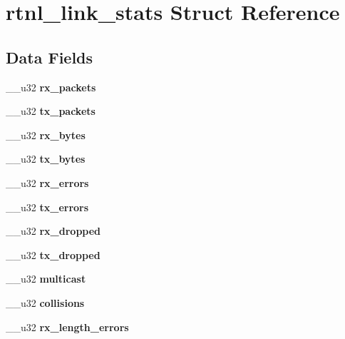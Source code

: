 \section{rtnl\-\_\-link\-\_\-stats \-Struct \-Reference}
\label{structrtnl__link__stats}
\subsection*{\-Data \-Fields}
\begin{DoxyCompactItemize}
\item 
\-\_\-\-\_\-u32 {\bfseries rx\-\_\-packets}\label{structrtnl__link__stats_aa3afa8a930bcd3352eb0101b363e3724}

\item 
\-\_\-\-\_\-u32 {\bfseries tx\-\_\-packets}\label{structrtnl__link__stats_a82861c7f00d557e73e629577f8e9a00d}

\item 
\-\_\-\-\_\-u32 {\bfseries rx\-\_\-bytes}\label{structrtnl__link__stats_a3627f5da128573208e2dad1c83ca9b5b}

\item 
\-\_\-\-\_\-u32 {\bfseries tx\-\_\-bytes}\label{structrtnl__link__stats_a989428ba6b047cdd85d98da112489ff9}

\item 
\-\_\-\-\_\-u32 {\bfseries rx\-\_\-errors}\label{structrtnl__link__stats_a31aaca1b6ee708ad896a4b07b1cd7a05}

\item 
\-\_\-\-\_\-u32 {\bfseries tx\-\_\-errors}\label{structrtnl__link__stats_a05d5f4e24194cf33aecd8a3f660b0043}

\item 
\-\_\-\-\_\-u32 {\bfseries rx\-\_\-dropped}\label{structrtnl__link__stats_a1b92e8392e11c8cb861d797a9ee7ca91}

\item 
\-\_\-\-\_\-u32 {\bfseries tx\-\_\-dropped}\label{structrtnl__link__stats_ab4bcde49fa5648188e9a78a558ba5f47}

\item 
\-\_\-\-\_\-u32 {\bfseries multicast}\label{structrtnl__link__stats_ac4a0e780f7c1368a3fd25b640b19ac23}

\item 
\-\_\-\-\_\-u32 {\bfseries collisions}\label{structrtnl__link__stats_a37fe42e8392393b297adc4aa24a865e8}

\item 
\-\_\-\-\_\-u32 {\bfseries rx\-\_\-length\-\_\-errors}\label{structrtnl__link__stats_a601b36790c0910e3bcf488788e4b6f0e}


\end{DoxyCompactItemize}
